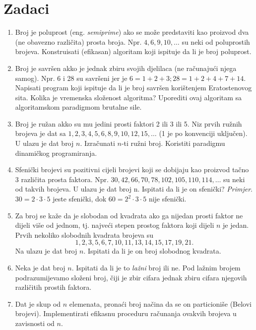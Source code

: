  
 \section*{Zadaci}
 
 \begin{enumerate}
 	\item Broj je poluprost (eng. \textit{semiprime}) ako se može predstaviti
 	kao proizvod dva (ne obavezno različita) prosta broja. Npr. $4, 6, 9, 10, \ldots$ su neki od poluprostih brojeva. Konstruisati (efikasan) algoritam koji ispituje da li je broj poluprost.
 	\item Broj je savršen akko je jednak zbiru svojih djelilaca (ne računajući njega samog). Npr. 6 i 28 su savršeni jer je $6 = 1 + 2 + 3; 28 = 1 + 2 + 4 + 7 + 14$. Napisati program koji ispituje da li je broj savršen korištenjem Eratostenovog sita. Kolika je vremenska složenost algoritma? Uporediti ovaj algoritam sa algoritamskom paradigmom brutalne sile.
 	\item Broj je ružan akko su mu jedini prosti faktori 2 ili 3 ili 5. Niz prvih ružnih brojeva je dat sa $1, 2, 3, 4, 5, 6, 8, 9, 10, 12, 15, \ldots$ (1 je po
 	konvenciji uključen). U ulazu je  dat broj $n$. Izračunati $n$-ti ružni broj. Koristiti paradigmu dinamičkog programiranja.
 	\item Sfenički brojevi su pozitivni cijeli brojevi koji se dobijaju kao proizvod tačno 3 različita prosta faktora. Npr. $30, 42, 66, 70, 78, 102, 105, 110, 114, \ldots$ su neki od takvih brojeva. U ulazu je dat broj n. Ispitati da li je on sfenički? \textit{Primjer}. $30=2 \cdot 3 \cdot 5$ jeste sfenički, dok $60 = 2^2 \cdot 3 \cdot 5 $ nije sfenički. 
 	\item Za broj se kaže da je slobodan od kvadrata ako ga nijedan
 	prosti faktor ne dijeli više od jednom, tj. najveći stepen prostog
 	faktora koji dijeli $n$  je jedan.  Prvih nekoliko slobodnih kvadrata brojeva su $$1, 2, 3, 5, 6, 7,
 	10, 11, 13, 14, 15, 17, 19, 21.$$   Na ulazu je dat broj $n$. Ispitati da li je on broj 	slobodnog kvadrata.
 	\item Neka je dat broj $n$. Ispitati da li je to \textit{lažni} broj ili ne.
 	Pod lažnim brojem podrazumijevamo složeni broj, čiji je zbir cifara jednak zbiru cifara njegovih različitih prostih faktora.%
 	
 	\item Dat je skup od $n$ elemenata, pronaći broj načina da se on particioniše (Belovi brojevi). Implementirati efikasnu proceduru računanja ovakvih brojeva u zavisnosti od $n$.  %
 \end{enumerate}